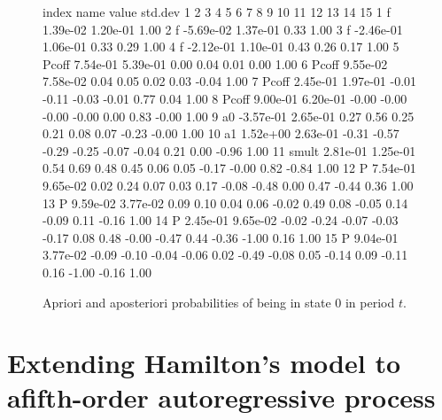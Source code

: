 \documentclass{admbmanual}
\begin{document}
\begin{figure}[htbp]
\centering
\begin{smallcode}[commentchar=\%]
 index name  value    std.dev    1     2     3     4     5     6     7     8%
     9    10    11    12    13    14   15
   1  f      1.39e-02 1.20e-01  1.00
   2  f     -5.69e-02 1.37e-01  0.33  1.00
   3  f     -2.46e-01 1.06e-01  0.33  0.29  1.00
   4  f     -2.12e-01 1.10e-01  0.43  0.26  0.17  1.00
   5  Pcoff  7.54e-01 5.39e-01  0.00  0.04  0.01  0.00  1.00
   6  Pcoff  9.55e-02 7.58e-02  0.04  0.05  0.02  0.03 -0.04  1.00
   7  Pcoff  2.45e-01 1.97e-01 -0.01 -0.11 -0.03 -0.01  0.77  0.04  1.00
   8  Pcoff  9.00e-01 6.20e-01 -0.00 -0.00 -0.00 -0.00  0.00  0.83 -0.00  1.00
   9  a0    -3.57e-01 2.65e-01  0.27  0.56  0.25  0.21  0.08  0.07 -0.23 -0.00%
  1.00
  10  a1     1.52e+00 2.63e-01 -0.31 -0.57 -0.29 -0.25 -0.07 -0.04  0.21  0.00%
 -0.96  1.00
  11  smult  2.81e-01 1.25e-01  0.54  0.69  0.48  0.45  0.06  0.05 -0.17 -0.00%
  0.82 -0.84  1.00
  12  P      7.54e-01 9.65e-02  0.02  0.24  0.07  0.03  0.17 -0.08 -0.48  0.00%
  0.47 -0.44  0.36  1.00
  13  P      9.59e-02 3.77e-02  0.09  0.10  0.04  0.06 -0.02  0.49  0.08 -0.05%
  0.14 -0.09  0.11 -0.16  1.00
  14  P      2.45e-01 9.65e-02 -0.02 -0.24 -0.07 -0.03 -0.17  0.08  0.48 -0.00%
 -0.47  0.44 -0.36 -1.00  0.16  1.00
  15  P      9.04e-01 3.77e-02 -0.09 -0.10 -0.04 -0.06  0.02 -0.49 -0.08  0.05%
 -0.14  0.09 -0.11  0.16 -1.00 -0.16 1.00
\end{smallcode}
\caption{Apriori and aposteriori probabilities of being in state 0 in period
  $t$.}
\label{fig:08}
\end{figure}

\section{Extending Hamilton's model to a\br fifth-order autoregressive process}
\end{document}
